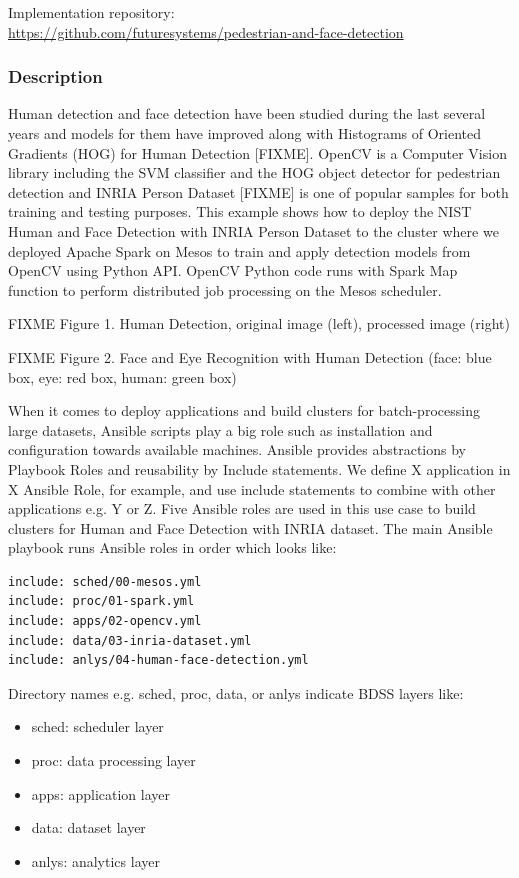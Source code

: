 \documentclass[9pt,twocolumn,twoside]{styles/osajnl}
\begin{document}
Implementation repository:\\
 \url{https://github.com/futuresystems/pedestrian-and-face-detection}

\subsubsection{Description}

Human detection and face detection have been studied during the last
several years and models for them have improved along with Histograms
of Oriented Gradients (HOG) for Human Detection [FIXME]. OpenCV is a
Computer Vision library including the SVM classifier and the HOG
object detector for pedestrian detection and INRIA Person Dataset [FIXME]
is one of popular samples for both training and testing purposes. This
example shows how to deploy the NIST Human and Face Detection with
INRIA Person Dataset to the cluster where we deployed Apache Spark on
Mesos to train and apply detection models from OpenCV using Python
API. OpenCV Python code runs with Spark Map function to perform
distributed job processing on the Mesos scheduler.
  
  

FIXME Figure 1. Human Detection, original image (left), processed image (right)
  
  

FIXME Figure 2. Face and Eye Recognition with Human Detection (face: blue box, eye: red box, human: green box)


When it comes to deploy applications and build clusters for
batch-processing large datasets, Ansible scripts play a big role such
as installation and configuration towards available machines. Ansible
provides abstractions by Playbook Roles and reusability by Include
statements. We define X application in X Ansible Role, for example,
and use include statements to combine with other applications e.g. Y
or Z. Five Ansible roles are used in this use case to build clusters
for Human and Face Detection with INRIA dataset. The main Ansible
playbook runs Ansible roles in order which looks like:


\begin{verbatim}
include: sched/00-mesos.yml
include: proc/01-spark.yml
include: apps/02-opencv.yml
include: data/03-inria-dataset.yml
include: anlys/04-human-face-detection.yml
\end{verbatim}
	

Directory names e.g. sched, proc, data, or anlys indicate BDSS layers like:
\begin{itemize}
\item sched: scheduler layer
\item proc: data processing layer
\item apps: application layer
\item data: dataset layer
\item anlys: analytics layer
\end{itemize}
\end{document}
